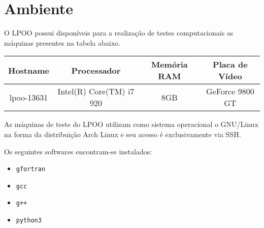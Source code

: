 %
\section{Ambiente}
O LPOO possui disponíveis para a realização de testes computacionais as máquinas
presentes na tabela abaixo.
\begin{table}[h]
  \centering
  \begin{tabular}{|c|c|c|c|}
    \hline
    Hostname & Processador & Memória RAM & Placa de Vídeo \\ \hline
    lpoo-13631 & Intel(R) Core(TM) i7 920 & 8GB & GeForce 9800 GT \\ \hline
  \end{tabular}
\end{table}

As máquinas de teste do LPOO utilizam como sistema operacional o GNU/Linux na forma da
distribuição Arch Linux e seu acesso é exclusivamente via SSH.

Os seguintes softwares encontram-se instalados:
\begin{itemize}
  \item \lstinline+gfortran+
  \item \lstinline+gcc+
  \item \lstinline!g++!
  \item \lstinline+python3+
\end{itemize}
